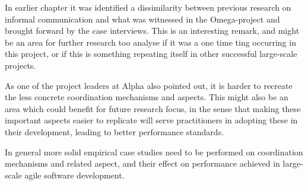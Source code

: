 In earlier chapter it was identified a dissimilarity between previous research on informal communication and what was witnessed in the Omega-project and brought forward by the case interviews. This is an interesting remark, and might be an area for further research too analyse if it was a one time ting occurring in this project, or if this is something repeating itself in other successful large-scale projects.

As one of the project leaders at Alpha also pointed out, it is harder to recreate the less concrete coordination mechanisms and aspects. This might also be an area which could benefit for future research focus, in the sense that making these important aspects easier to replicate will serve practitioners in adopting these in their development, leading to better performance standards.

In general more solid empirical case studies need to be performed on coordination mechanisms and related aspect, and their effect on performance achieved in large-scale agile software development.

\newpage